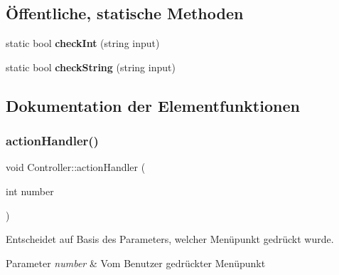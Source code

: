 \subsection*{Öffentliche, statische Methoden}
\begin{DoxyCompactItemize}
\item 
\mbox{\label{classContactManager_1_1Controller_a9228c2d2d075707af32f9cceded67566}} 
static bool {\bfseries check\+Int} (string input)
\item 
\mbox{\label{classContactManager_1_1Controller_a409958c7f170c9e269e258bb5a4483e2}} 
static bool {\bfseries check\+String} (string input)
\end{DoxyCompactItemize}


\subsection{Dokumentation der Elementfunktionen}
\mbox{\label{classContactManager_1_1Controller_afd2e274df3edef5ab0abf90aae5ad21c}} 
\subsubsection{\texorpdfstring{action\+Handler()}{actionHandler()}}
{\footnotesize\ttfamily void Controller\+::action\+Handler (\begin{DoxyParamCaption}\item[{int}]{number }\end{DoxyParamCaption})}



Entscheidet auf Basis des Parameters, welcher Menüpunkt gedrückt wurde.


\begin{DoxyParams}{Parameter}
{\em number} & Vom Benutzer gedrückter Menüpunkt\\
\hline
\end{DoxyParams}
\mbox{\label{classContactManager_1_1Controller_aa10f0286519a294d96077af9eaa7b98c}} 
